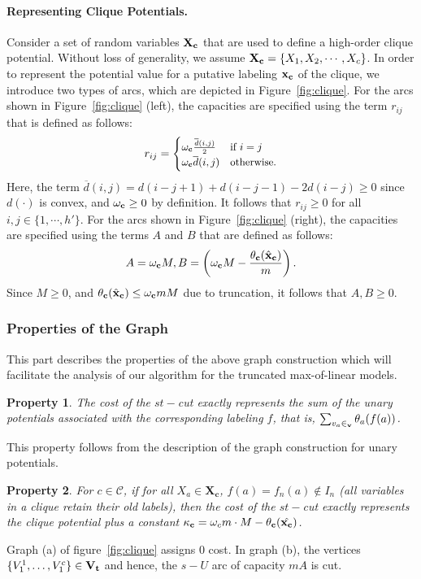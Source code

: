 \documentclass[10pt,letterpaper]{article}
\newcommand{\myparagraph}[1]{\vspace{0mm}\paragraph{#1}}
\newtheorem{property}{Property}
\begin{document}
\myparagraph{\bf Representing Clique Potentials.}
Consider a set of random variables ${\bf X}_{\bf c}$ that are used to define a high-order clique potential. Without loss of generality, we assume
${\bf X}_{\bf c} = \{X_1,X_2,\cdots,X_c\}$. In order to represent the potential value for a putative labeling ${\bf x}_{\bf c}$ of the clique, we
introduce two types of arcs, which are depicted in Figure~\ref{fig:clique}. For the arcs shown in Figure~\ref{fig:clique} (left), the capacities are
specified using the term $r_{ij}$ that is defined as follows:
\begin{equation}
\small r_{ij} = 
\begin{cases}
\omega_{\bf c}\frac{\overline{d}(i,j)}{2} & \text{if } i = j\\
\omega_{\bf c}\overline{d}(i,j)   & \text{otherwise.}
\end{cases}
\label{eq:convexCapacity}
\end{equation}
Here, the term $\overline{d}(i,j) = d(i-j+1) + d(i-j-1) - 2d(i-j) \geq 0$ since $d(\cdot)$ is convex, and
$\omega_{\bf c} \geq 0$ by definition. It follows that $r_{ij} \geq 0$ for all $i,j \in \{1,\cdots,h'\}$. 
For the arcs shown in Figure~\ref{fig:clique} (right), the capacities are specified using the terms $A$ and $B$ that are defined as follows:
\begin{equation}
\small A = \omega_{\bf c}M, B = \left(\omega_{\bf c}M-\frac{\theta_{\bf c}(\hat{\bf x}_{\bf c})}{m}\right).
\label{eq:submodCapacity}
\end{equation}
Since $M \geq 0$, and $\theta_{\bf c}(\hat{\bf x}_{\bf c}) \leq \omega_{\bf c}mM$ due to truncation, it follows that $A, B \geq 0$.


\subsubsection{Properties of the Graph}
\label{subsec:graph_properties}

This part describes the properties of the above graph construction which will facilitate the analysis of our algorithm for the truncated max-of-linear models.

\begin{property}The cost of the $st-$cut exactly represents the sum of the unary potentials associated with the corresponding labeling $f$, that is, $\sum_{v_a \in \bf_v} \theta_{a}(f(a))$.
\end{property}
This property follows from the description of the graph construction for unary potentials.
\begin{property} For $c \in \mathcal{C}$, if for all $X_a \in \mathbf{X_c}$, $f(a) = f_n(a) \notin I_n$ (all variables in a clique retain their old labels), then the cost of the $st-$cut exactly represents the clique potential plus a constant ${\bf \kappa}_{\bf c} = \omega_c m \cdot M - \theta_{\bf c}(\hat{{\bf x}_{\bf c}})$.
\end{property}
Graph (a) of figure~\ref{fig:clique} assigns $0$ cost. In graph (b), the vertices $\{V_1^1, \dots, V_1^c \} \in {\bf V}_{\bf t}$ and hence, the $s-U$ arc of capacity $mA$ is cut. 
\end{document}
